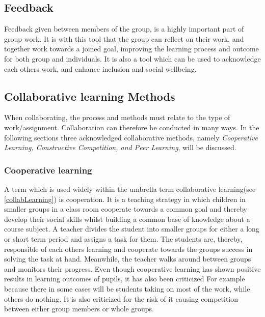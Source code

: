 \subsection{Feedback}
Feedback given between members of the group, is a highly important part of group work\cite{laeringIPraksis}\cite{ProjektarbejdesKompleksitet}. It is with this tool that the group can reflect on their work, and together work towards a joined goal, improving the learning process and outcome for both group and individuals\cite{laeringIPraksis}\cite{ProjektarbejdesKompleksitet}. It is also a tool which can be used to acknowledge each others work, and enhance inclusion and social wellbeing\cite{laeringIPraksis}\cite{ProjektarbejdesKompleksitet}. 


\subsection{Collaborative learning Methods} 
When collaborating, the process and methods must relate to the type of work/assignment. Collaboration can therefore be conducted in many ways. In the following sections three acknowledged collaborative methods, namely \textit{Cooperative Learning, Constructive Competition, and Peer Learning}, will be discussed.  

\subsubsection{Cooperative learning}
A term which is used widely within the umbrella term collaborative learning(see \autoref{collabLearning}) is cooperation\cite{collaborationCooperation}. It is a teaching strategy in which children in smaller groups in a class room cooperate towards a common goal and thereby develop their social skills whilst building a common base of knowledge about a course subject\cite{collaborativeLearningTeachers}\cite[p.~15]{peerLearning}\cite{collaborationCompetition}\cite{cooperativeLearningPractice}. A teacher divides the student into smaller groups for either a long or short term period and assigns a task for them. The students are, thereby, responsible of each others learning and cooperate towards the groups success in solving the task at hand. Meanwhile, the teacher walks around between groups and monitors their progress\cite{cooperativeLearningPractice}. Even though cooperative learning has shown positive results in learning outcomes of pupils, it has also been criticized For example because there in some cases will be students taking on most of the work, while others do nothing. It is also criticized for the risk of it causing competition between either group members or whole groups\cite{collaborationCooperation}.

